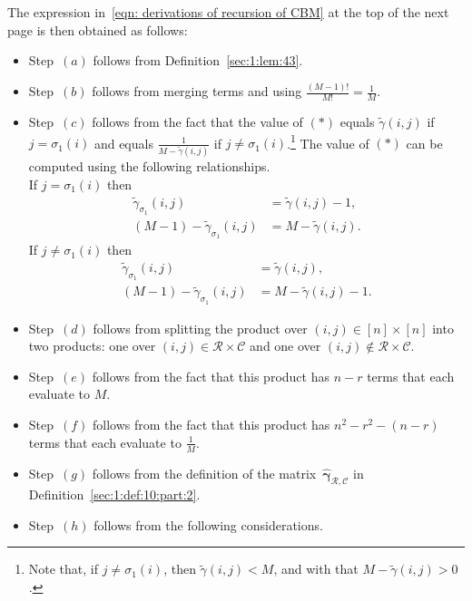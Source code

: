 \documentclass[journal,lettersize,twocolumn]{IEEEtran} %
\newcommand{\vect}[1]{ \bm{#1} }
\newcommand{\set}[1]{\mathcal{#1}}
\newcommand{\vgam}{ \vect{\gamma} }
\newcommand{\setC}{\set{C}}
\newcommand{\setR}{\set{R}}
\newcommand{\tgam}{\tilde{\gamma}}
\newcommand{\hvgamRCp}{ \hat{\vgam}_{\setR,\setC} }
\begin{document}
\begin{appendices}
%

The expression in~\eqref{eqn: derivations of recursion of
  CBM} at the top of the next page is then obtained as follows:
\begin{itemize}

\item Step~$(a)$ follows from Definition~\ref{sec:1:lem:43}.

\item Step~$(b)$ follows from merging terms and using
  $\frac{(M-1)!}{M!} \! = \! \frac{1}{M}$.

\item Step~$(c)$ follows from the fact that the value of $(*)$ equals
  $\tgam(i,j)$ if $j = \sigma_1(i)$ and equals $\frac{1}{M - \tgam(i,j)}$ if
  $j \neq \sigma_1(i)$.\footnote{Note that, if $j \neq \sigma_1(i)$, then
    $\tgam(i,j) < M$, and with that $M - \tgam(i,j) > 0$.}%
  The value of $(*)$ can be computed using the following relationships. \\
  If $j = \sigma_1(i)$ then
  \begin{align*}
    \tgam_{\sigma_1}(i,j)
      &= \tgam(i,j) - 1, \\
    (M-1) - \tgam_{\sigma_1}(i,j)
      &= M - \tgam(i,j).
  \end{align*}
  If $j \neq \sigma_1(i)$ then
  \begin{align*}
    \tgam_{\sigma_1}(i,j)
      &= \tgam(i,j), \\
    (M-1) - \tgam_{\sigma_1}(i,j)
      &= M - \tgam(i,j) - 1.
  \end{align*}

\item Step~$(d)$ follows from splitting the product over
  $(i,j) \in [n] \times [n]$ into two products: one over
  $(i,j) \in \setR \times \setC$ and one over
  $(i,j) \notin \setR \times \setC$.

\item Step~$(e)$ follows from the fact that this product has $n - r$ terms
  that each evaluate to $M$.

\item Step~$(f)$ follows from the fact that this product has $n^2 - r^2 -
  (n \! - \! r)$ terms that each evaluate to $\frac{1}{M}$.

\item Step~$(g)$ follows from the definition of the matrix~$\hvgamRCp$ in
  Definition~\ref{sec:1:def:10:part:2}.

\item Step~$(h)$ follows from the following considerations.


\end{itemize}
\end{appendices}
\end{document}
